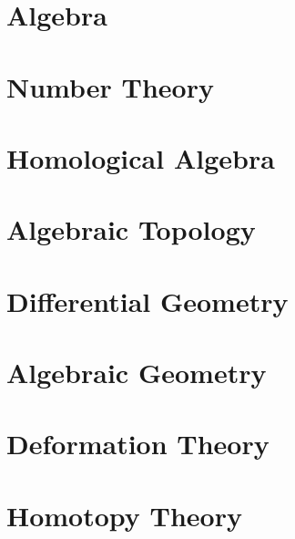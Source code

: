 \documentclass{report}
\begin{document}
\chapter{Algebra}
\renewcommand{\cat}{AA}











\chapter{Number Theory}
\renewcommand{\cat}{NT}




\chapter{Homological Algebra}
\renewcommand{\cat}{HA}




\chapter{Algebraic Topology}
\renewcommand{\cat}{AT}


\chapter{Differential Geometry}
\renewcommand{\cat}{DG}




\chapter{Algebraic Geometry}
\renewcommand{\cat}{AG}







\chapter{Deformation Theory}
\renewcommand{\cat}{DT}


\chapter{Homotopy Theory}
\renewcommand{\cat}{HT}



\end{document}
